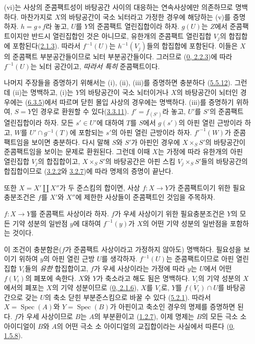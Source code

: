 (vi)는 사상의 준콤팩트성이 바탕공간 사이의 대응하는 연속사상에만
의존하므로 명백하다. 마찬가지로 $X$의 바탕공간이 국소 뇌터라고 가정한
경우에 해당하는 (v)를 증명하자. $h=g\circ f$라 놓고, $U$를 $Y$의
준콤팩트 열린집합이라 하자. $g(U)$는 $Z$에서 준콤팩트이지만 반드시
열린집합인 것은 아니므로, 유한개의 준콤팩트 열린집합 $V_j$의 합집합에
포함된다(\hyperref[I.2.1.3-ko]{2.1.3}). 따라서 $f^{-1}(U)$는
$h^{-1}(V_j)$들의 합집합에 포함된다. 이들은 $X$의 준콤팩트
부분공간들이므로 뇌터 부분공간들이다. 그러므로
(\hyperref[0.2.2.3-ko]{0, 2.2.3})에 따라 $f^{-1}(U)$는 뇌터 공간이고,
\emph{따라서 특히} 준콤팩트이다.

나머지 주장들을 증명하기 위해서는 (i), (ii), (iii)를 증명하면 충분하다
(\hyperref[I.5.5.12-ko]{5.5.12}). 그런데 (ii)는 명백하고, (i)는 $Y$의
바탕공간이 국소 뇌터이거나 $X$의 바탕공간이 뇌터인 경우에는
(\hyperref[I.6.3.5-ko]{6.3.5})에서 따르며 닫힌 몰입 사상의 경우에는
명백하다. (iii)를 증명하기 위하여,
$S=Y$인 경우로 환원할 수 있다(\hyperref[I.3.3.11-ko]{3.3.11}).
$f'=f_{(S')}$라 놓고, $U'$를 $S'$의 준콤팩트 열린집합이라 하자. 모든
$s'\in U'$에 대하여 $T$를 $S$에서 $g(s')$의 아핀 열린 근방이라 하고,
$W$를 $U'\cap g^{-1}(T)$에 포함되는 $s'$의 아핀 열린 근방이라 하자.
$f'^{-1}(W)$가 준콤팩트임을 보이면 충분하다. 다시 말해 $S$와 $S'$가
아핀인 경우에 $X\times_S S'$의 바탕공간이 준콤팩트임을 보이는 문제로
환원된다. 그런데 이때 $X$는 가정에 따라 유한개의 아핀 열린집합 $V_j$의
합집합이고, $X\times_S S'$의 바탕공간은 아핀 스킴
$V_j\times_S S'$들의 바탕공간의 합집합이므로
(\hyperref[I.3.2.2-ko]{3.2.2}와 \hyperref[I.3.2.7-ko]{3.2.7})에 따라 명제의
증명이 끝난다.

또한 $X=X'\amalg X''$가 두 준스킴의 합이면, 사상 $f:X\to Y$가
준콤팩트이기 위한 필요충분조건은 $f$를 $X'$와 $X''$에 제한한 사상들이
준콤팩트인 것임을 주목하자.

\begin{proposition}[6.6.5]
\label{I.6.6.5-ko}
$f:X\to Y$를 준콤팩트 사상이라 하자. $f$가 우세 사상이기 위한
필요충분조건은 $Y$의 모든 기약 성분의 일반점 $y$에 대하여
$f^{-1}(y)$가 $X$의 어떤 기약 성분의 일반점을 포함하는 것이다.
\end{proposition}

이 조건이 충분함은($f$가 준콤팩트 사상이라고 가정하지 않아도) 명백하다.
필요성을 보이기 위하여 $y$의 아핀 열린 근방 $U$를 생각하자.
$f^{-1}(U)$는 준콤팩트이므로 아핀 열린집합 $V_i$들의 \emph{유한}
합집합이고, $f$가 우세 사상이라는 가정에 따라 $y$는 $U$에서 어떤
$f(V_i)$의 폐포에 속한다. $X$와 $Y$가 축소라고 해도 됨은 명백하다.
$V_i$의 기약 성분의 $X$에서의 폐포는 $X$의 기약 성분이므로
(\hyperref[0.2.1.6-ko]{0, 2.1.6}), $X$를 $V_i$로, $Y$를
$\overline{f(V_i)}\cap U$를 바탕공간으로 갖는 $U$의 축소 닫힌
부분준스킴으로 바꿀 수 있다
(\hyperref[I.5.2.1-ko]{5.2.1}). 따라서 $X=\operatorname{Spec}(A)$와
$Y=\operatorname{Spec}(B)$가 아핀이고 축소인 경우의 명제를 증명하면 된다.
$f$가 우세 사상이므로 $B$는 $A$의 부분환이고
(\hyperref[I.1.2.7-ko]{1.2.7}), 이제 명제는 $B$의 모든 극소 소 아이디얼이
$B$와 $A$의 어떤 극소 소 아이디얼의 교집합이라는 사실에서 따른다
(\hyperref[0.1.5.8-ko]{0, 1.5.8}).

